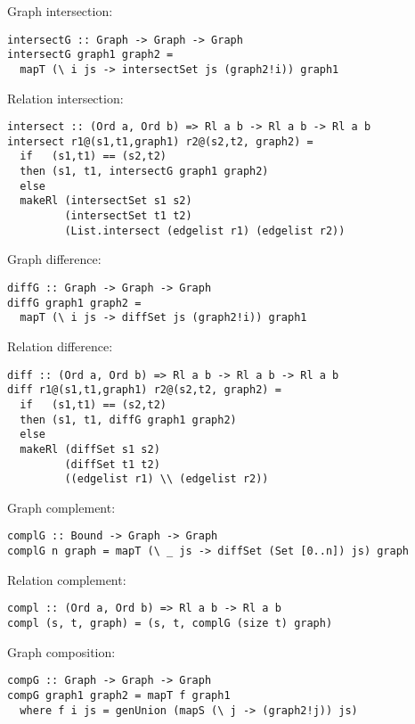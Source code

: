 Graph intersection: 

\bc\begin{verbatim}
intersectG :: Graph -> Graph -> Graph 
intersectG graph1 graph2 = 
  mapT (\ i js -> intersectSet js (graph2!i)) graph1
\end{verbatim}\ec

Relation intersection: 

\bc\begin{verbatim}
intersect :: (Ord a, Ord b) => Rl a b -> Rl a b -> Rl a b 
intersect r1@(s1,t1,graph1) r2@(s2,t2, graph2) = 
  if   (s1,t1) == (s2,t2)
  then (s1, t1, intersectG graph1 graph2)  
  else 
  makeRl (intersectSet s1 s2) 
         (intersectSet t1 t2) 
         (List.intersect (edgelist r1) (edgelist r2))
\end{verbatim}\ec

Graph difference: 

\bc\begin{verbatim}
diffG :: Graph -> Graph -> Graph 
diffG graph1 graph2 = 
  mapT (\ i js -> diffSet js (graph2!i)) graph1
\end{verbatim}\ec

Relation difference: 

\bc\begin{verbatim}
diff :: (Ord a, Ord b) => Rl a b -> Rl a b -> Rl a b 
diff r1@(s1,t1,graph1) r2@(s2,t2, graph2) = 
  if   (s1,t1) == (s2,t2)
  then (s1, t1, diffG graph1 graph2)  
  else 
  makeRl (diffSet s1 s2) 
         (diffSet t1 t2) 
         ((edgelist r1) \\ (edgelist r2))
\end{verbatim}\ec

Graph complement: 

\bc\begin{verbatim}
complG :: Bound -> Graph -> Graph
complG n graph = mapT (\ _ js -> diffSet (Set [0..n]) js) graph
\end{verbatim}\ec

Relation complement: 

\bc\begin{verbatim}
compl :: (Ord a, Ord b) => Rl a b -> Rl a b 
compl (s, t, graph) = (s, t, complG (size t) graph)
\end{verbatim}\ec

Graph composition: 

\bc\begin{verbatim}
compG :: Graph -> Graph -> Graph 
compG graph1 graph2 = mapT f graph1 
  where f i js = genUnion (mapS (\ j -> (graph2!j)) js)
\end{verbatim}\ec

